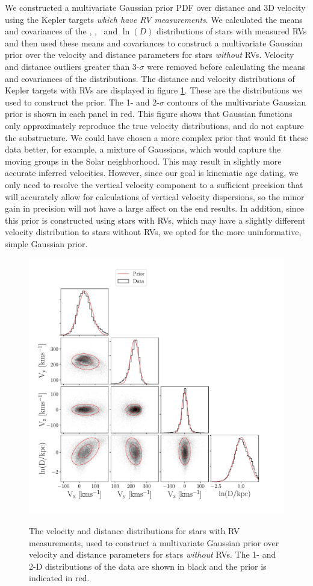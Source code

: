 We constructed a multivariate Gaussian prior PDF over distance and 3D velocity
using the Kepler targets {\it which have RV measurements}.
We calculated the means and covariances of the \vx, \vy, \vz\ and $\ln(D)$
distributions of stars with measured RVs and then used these means and
covariances to construct a multivariate Gaussian prior over the velocity and
distance parameters for stars {\it without} RVs.
Velocity and distance outliers greater than 3-$\sigma$ were removed before
calculating the means and covariances of the distributions.
The distance and velocity distributions of Kepler targets with RVs are
displayed in figure \ref{fig:prior_distributions_2D}.
These are the distributions we used to construct the prior.
The 1- and 2-$\sigma$ contours of the multivariate Gaussian prior is shown in
each panel in red.
This figure shows that Gaussian functions only approximately reproduce
the true velocity distributions, and do not capture the substructure.
We could have chosen a more complex prior that would fit these data better,
for example, a mixture of Gaussians, which would capture the moving groups in
the Solar neighborhood.
This may result in slightly more accurate inferred velocities.
However, since our goal is kinematic age dating, we only need to resolve the
vertical velocity component to a sufficient precision that will accurately
allow for calculations of vertical velocity dispersions, so the minor gain in
precision will not have a large affect on the end results.
In addition, since this prior is constructed using stars with RVs, which may
have a slightly different velocity distribution to stars without RVs, we opted
for the more uninformative, simple Gaussian prior.

\begin{figure}[ht!]
\caption{
The velocity and distance distributions for stars with RV measurements,
    used to construct a multivariate Gaussian prior over velocity and
    distance parameters for stars {\it without} RVs.
The 1- and 2-D distributions of the data are shown in black and the prior is
    indicated in red.
}
  \centering
    \includegraphics[width=.8\textwidth]{prior_distributions_2D}
\label{fig:prior_distributions_2D}
\end{figure}

